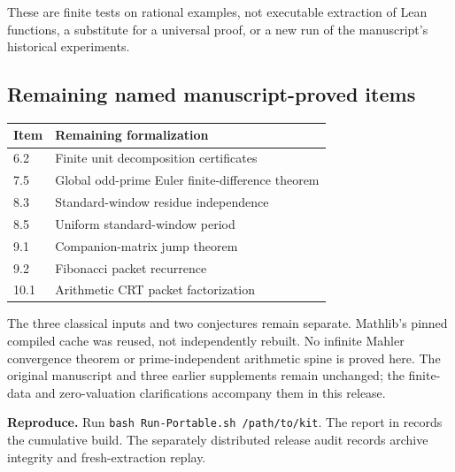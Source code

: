 \documentclass[11pt]{article}
\begin{document}
These are finite tests on rational examples, not executable extraction of Lean functions, a substitute for a universal proof, or a new run of the manuscript's historical experiments.

\subsection*{Remaining named manuscript-proved items}
\begin{center}
\begin{tabular}{@{}ll@{}}\toprule
Item & Remaining formalization\\\midrule
6.2 & Finite unit decomposition certificates\\
7.5 & Global odd-prime Euler finite-difference theorem\\
8.3 & Standard-window residue independence\\
8.5 & Uniform standard-window period\\
9.1 & Companion-matrix jump theorem\\
9.2 & Fibonacci packet recurrence\\
10.1 & Arithmetic CRT packet factorization\\\bottomrule
\end{tabular}
\end{center}
The three classical inputs and two conjectures remain separate. Mathlib's pinned compiled cache was reused, not independently rebuilt. No infinite Mahler convergence theorem or prime-independent arithmetic spine is proved here. The original manuscript and three earlier supplements remain unchanged; the finite-data and zero-valuation clarifications accompany them in this release.

\textbf{Reproduce.} Run \texttt{bash Run-Portable.sh /path/to/kit}. The report in  records the cumulative build. The separately distributed release audit records archive integrity and fresh-extraction replay.
\end{document}
